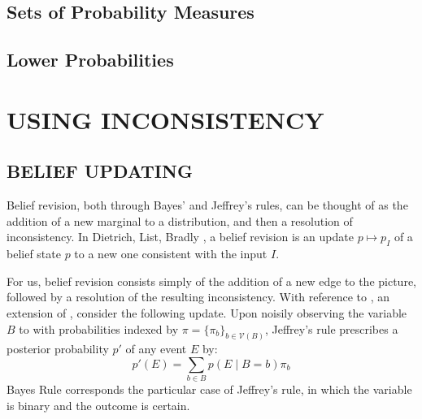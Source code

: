 \documentclass{article}
\def\sheq{\!=\!}
\newcommand{\V}{\mathcal V}
\numberwithin{equation}{section}
\begin{document}
\begin{notfocus}
\begin{vfull}
\begin{center}
		\end{center}
		
	
		
	
		\subsection{Sets of Probability Measures}
	
	
		
		\subsection{Lower Probabilities}
	\end{vfull}


	\section{USING INCONSISTENCY}	
	\subsection{BELIEF UPDATING} \label{sec:belief-update}
	Belief revision, both through Bayes' and Jeffrey's rules, can be thought of as the addition of a new marginal to a distribution, and then a resolution of inconsistency. In Dietrich, List, Bradly \cite{dietrich2016belief}, a belief revision is an update $p \mapsto p_I$ of a belief state $p$ to a new one consistent with the input $I$. 
	
	For us, belief revision consists simply of the addition of a new edge to the picture, followed by a resolution of the resulting inconsistency. 
	With reference to , an extension of , consider the following update. 
	Upon noisily observing the variable $B$ to with probabilities indexed by $\pi = \{\pi_b\}_{b \in \V(B)}$, Jeffrey's rule prescribes a posterior probability $p'$ of any event $E$ by:
	\[ p'(E) = \sum_{b \in B} p(E \mid B\sheq b) \pi_b \]
	Bayes Rule corresponds the particular case of Jeffrey's rule, in which the variable is binary and the outcome is certain.


\end{notfocus}
\end{document}

